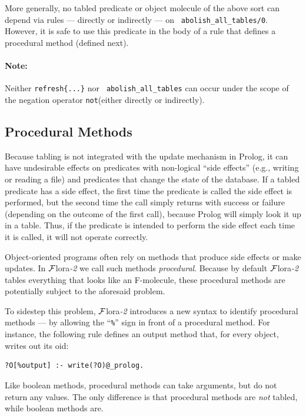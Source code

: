 \documentclass[11pt]{article}
\newcommand{\FLORA}{{\mbox{\sc ${\cal F}${lora}\rm\emph{-2}}}\xspace}
\newcommand{\TNOT}{{{\tt not}}\xspace}
\begin{document}
More generally, no tabled predicate or object molecule of the above sort
can depend via rules --- directly or indirectly --- on {\tt
  abolish\_all\_tables/0}.  However, it is safe to use this predicate in
the body of a rule that defines a procedural method (defined next).

\paragraph{Note:} Neither {\tt refresh\{...\}} nor {\tt
  abolish\_all\_tables} can occur under the scope of the
negation operator  \TNOT (either directly or indirectly).


\subsection{Procedural Methods}\label{sec-proc-methods}

%
Because tabling is not integrated with the update mechanism in Prolog, it can
have undesirable effects on predicates with non-logical ``side effects''
(e.g., writing or reading a file) and predicates that change the state of
the database.  If a tabled predicate has a side effect, the first time the
predicate is called the side effect is performed, but the second time the
call simply returns with success or failure (depending on the outcome of
the first call), because Prolog will simply look it up in a table.  Thus, if
the predicate is intended to perform the side effect each time it is
called, it will not operate correctly.

Object-oriented programs often rely on methods that produce side effects
or make updates.  In \FLORA we call such methods \emph{procedural}.
Because by default \FLORA tables everything that looks like an F-molecule,
these procedural methods are potentially subject to the aforesaid problem.

To sidestep this problem, \FLORA introduces a new syntax to identify
procedural methods --- by allowing the ``\verb|%|'' sign in front of a
procedural method. For instance, the following rule defines an output
method that, for every object, writes out its oid:
\begin{verbatim}
?O[%output] :- write(?O)@_prolog.
\end{verbatim}
Like boolean methods, procedural methods can take arguments, but do not
return any values.  The only difference is that procedural methods are
\emph{not} tabled, while boolean methods are.
\end{document}
